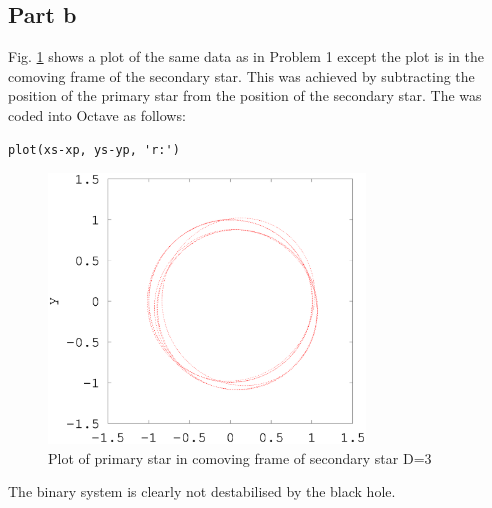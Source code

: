 \documentclass[a4paper,12pt]{article}
\begin{document}
\subsection{Part b}
Fig. \ref{fig:problem3_2} shows a plot of the same data as in Problem 1 except the plot is in the comoving frame of the secondary star. This was achieved by subtracting the position of the primary star from the position of the secondary star. The was coded into Octave as follows:
\begin{lstlisting}
plot(xs-xp, ys-yp, 'r:')
\end{lstlisting}
\begin{figure}[H]
\centering
\includegraphics[width=0.75\textwidth]{./problem3/problem3_2}
\caption{Plot of primary star in comoving frame of secondary star D=3}
\label{fig:problem3_2}
\end{figure}
The binary system is clearly not destabilised by the black hole.
\end{document}
